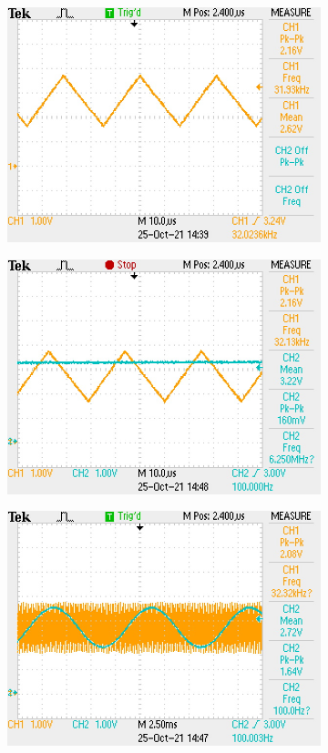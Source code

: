 \documentclass[a4paper,11pt]{article}
\begin{document}
\begin{figure}[h!]
    \centering
    \begin{subfigure}{0.52\textwidth}
        \includegraphics[width=0.85\columnwidth]{spwm/triangle_wave_32kHz.JPG}
        \label{F:triangle_implemented}
    \end{subfigure}
    \begin{subfigure}{0.49\textwidth}
        \includegraphics[width=0.85\columnwidth]{spwm/input_sampling_1.JPG}
        \label{F:sampling_implemented}
    \end{subfigure}
    \begin{subfigure}{0.49\textwidth}
        \includegraphics[width=0.85\columnwidth]{spwm/input_sampling_0.JPG}

\end{subfigure}
\end{figure}
\end{document}
